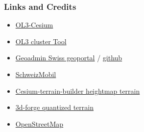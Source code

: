 \documentclass[handout]{beamer}
\begin{document}
  \begin{frame}
    \frametitle{Links and Credits}
    \begin{itemize}
      \pause\item \href {https://github.com/openlayers/ol3-cesium}{OL3-Cesium}
      \pause\item \href {https://github.com/gberaudo/ol3-cluster-tool}{OL3 cluster Tool}
      \pause\item \href {https://github.com/geoadmin/mf-geoadmin3}{Geoadmin Swiss geoportal} / \href {https://map.geo.admin.ch}{github}
      \pause\item \href {https://map.schweizmobil.ch}{SchweizMobil}
      \pause\item \href {https://github.com/geo-data/cesium-terrain-builder}{Cesium-terrain-builder heightmap terrain}
      \pause\item \href {https://github.com/geoadmin/3d-forge}{3d-forge quantized terrain}
      \pause\item \href {https://www.openstreetmap.org/about}{OpenStreetMap}
    \end{itemize}
  \end{frame}
\end{document}
